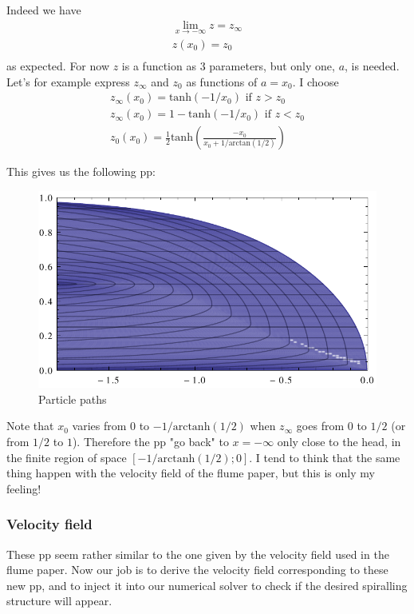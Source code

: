 \documentclass[11pt]{article}
\begin{document}
Indeed we have 
\[
\begin{matrix}
	\lim_{x \rightarrow -\infty} z = z_\infty \\
	z(x_0) = z_0 \\
\end{matrix}
\]
as expected. For now $z$ is a function as 3 parameters, but only one, $a$, is needed.
Let's for example express $z_\infty$ and $z_0$ as functions of $a = x_0$. I choose
\[
\begin{matrix}
   z_\infty(x_0) = \text{tanh}(-1/x_0) \text{ if } z > z_0 \\
   z_\infty(x_0) = 1 - \text{tanh}(-1/x_0) \text{ if } z < z_0 \\
   z_0(x_0) = \frac{1}{2} \text{tanh}\left(\frac{-x_0}{x_0+1/\text{arctan}(1/2)}\right) 
\end{matrix}
\]

This gives us the following pp:

\begin{figure}[htp]
\centering
\includegraphics[scale=0.9]{remap_particle_paths.pdf}
\caption{Particle paths}
\label{}
\end{figure}

Note that $x_0$ varies from $0$ to $-1/\text{arctanh}(1/2)$ when $z_\infty$ goes from $0$ to $1/2$ (or from $1/2$ to $1$).
Therefore the pp "go back" to $x = -\infty$ only close to the head, in the finite region of space $[-1/\text{arctanh}(1/2);0]$.
I tend to think that the same thing happen with the velocity field of the flume paper, but this is only my feeling!

\subsubsection{Velocity field}

These pp seem rather similar to the one given by the velocity field used in the flume paper.
Now our job is to derive the velocity field corresponding to these new pp, and to inject it into our numerical solver to check if the desired spiralling structure will appear.
\end{document}
